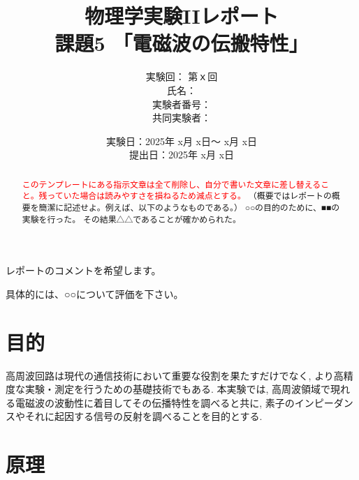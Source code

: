 \documentclass[uplatex,dvipdfmx,a4j,12pt]{jsarticle}
\title{
  物理学実験IIレポート\\    %
  課題5 「電磁波の伝搬特性」
  }
\author{
  実験回： 第ｘ回 \\
  氏名： \\
  実験者番号：
  \\
  共同実験者：
  }
\date{
  実験日：2025年 x月 x日～ x月 x日 \\
  提出日：2025年 x月 x日}  %
\begin{document}
\maketitle


\vspace{2em}
\begin{center}
    \begin{minipage}{0.5\linewidth}
        レポートのコメントを希望します。

        具体的には、○○について評価を下さい。
    \end{minipage}
\end{center}

\vspace{5em}  


%
\begin{abstract}
    \textcolor{red}{このテンプレートにある指示文章は全て削除し、自分で書いた文章に差し替えること。残っていた場合は読みやすさを損ねるため減点とする。}
    （概要ではレポートの概要を簡潔に記述せよ。例えば、以下のようなものである。）
    ○○の目的のために、■■の実験を行った。
    その結果△△であることが確かめられた。
\end{abstract}

\newpage


\section{目的}
高周波回路は現代の通信技術において重要な役割を果たすだけでなく, より高精度な実験・測定を行うための基礎技術でもある.
本実験では, 高周波領域で現れる電磁波の波動性に着目してその伝播特性を調べると共に, 素子のインピーダンスやそれに起因する信号の反射を調べることを目的とする.

\section{原理}
\end{document}
